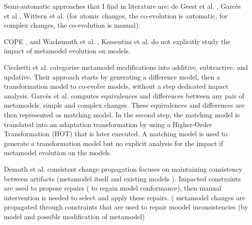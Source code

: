 Semi-automatic approaches that I find in literature are: de Geest et al. \cite{de2008generating},  Garcès et al \cite{garces2014adapting}, Wittern et al. \cite{wittern2013determining} (for atomic changes, the co-evolution is automatic, for complex changes, the co-evolution is manual).



COPE \cite{herrmannsdoerfer2009cope}, and Wachsmuth et al. \cite{wachsmuth2007metamodel}, Kessentini et al. \cite{kessentini2018integrating,kessentini2020interactive} do not explicitly study the impact of metamodel evolution on  models.
 
 Cicchetti et al. \cite{cicchetti2008automating} categorize metamodel modifications  into additive, subtractive, and updative. Their approach starts by generating a difference model, then a transformation model to co-evolve models, without a step dedicated impact analysis.
Garcès et al. \cite{garces2009managing} computes equivalences and differences between any pair of metamodels, simple and complex changes. These equivalences and differences are then represented as matching model. In the second step, the matching model is translated into an adaptation transformation by using a Higher-Order Transformation (HOT) that is later executed. A matching model is used to generate a transformation model but no explicit analysis for the impact if metamodel evolution on the models.

Demuth et al.\cite{demuth2016co} consistent change propagation focuses on maintaining consistency between artifacts (metamodel itself and existing models ). Impacted constraints are used to propose repairs ( to regain model conformance), then manual intervention is needed to select and apply these repairs. ( metamodel changes are propagated through constraints that are used to repair moodel inconsistencies (by model and possible modification of metamodel)

 

